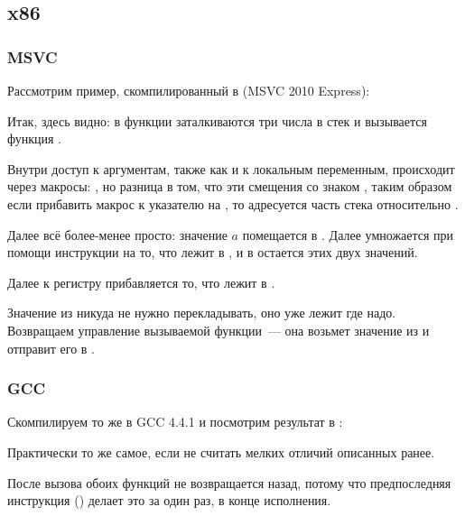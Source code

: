 \subsection{x86}

\subsubsection{MSVC}

Рассмотрим пример, скомпилированный в (MSVC 2010 Express):



Итак, здесь видно: в функции \main заталкиваются три числа в стек и вызывается функция .
 
Внутри \ttf доступ к аргументам, также как и к локальным переменным, происходит через макросы: 
, но разница в том, что эти смещения со знаком , 
таким образом если прибавить макрос  к указателю на \EBP, то адресуется  
часть  стека относительно \EBP.

Далее всё более-менее просто: значение $a$ помещается в \EAX. 
Далее \EAX умножается при помощи инструкции \IMUL на то, что лежит в , 
и в \EAX остается  этих двух значений.

Далее к регистру \EAX прибавляется то, что лежит в .

Значение из \EAX никуда не нужно перекладывать, оно уже лежит где надо. 
Возвращаем управление вызываемой функции~--- она возьмет значение из \EAX и отправит его в \printf.



\subsubsection{GCC}

Скомпилируем то же в GCC 4.4.1 и посмотрим результат в \IDA:



Практически то же самое, если не считать мелких отличий описанных ранее.

После вызова обоих функций  не возвращается назад, 
потому что предпоследняя инструкция  () делает это за один раз, в конце исполнения.

